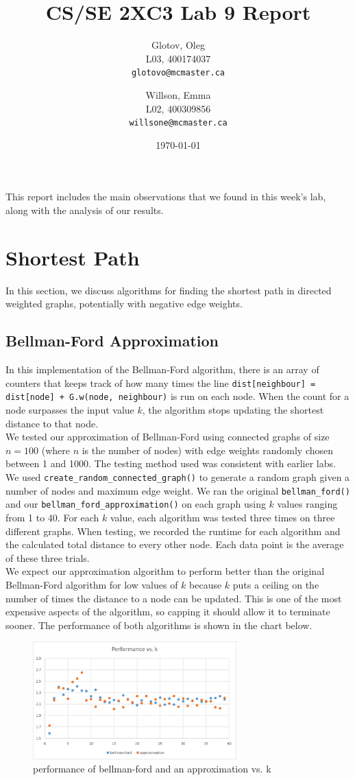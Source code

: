 \documentclass[12pt]{article}
\title{CS/SE 2XC3 Lab 9 Report}
\author{
  Glotov, Oleg\\ L03, 400174037\\
  \texttt{glotovo@mcmaster.ca}
  \and
  Willson, Emma\\ L02, 400309856\\
  \texttt{willsone@mcmaster.ca}
  }
\date{\today}
\begin{document}
\maketitle

This report includes the main observations that we found in this week's lab, along with the analysis of our results.

\newpage 
\section{Shortest Path}
In this section, we discuss algorithms for finding the shortest path in directed weighted graphs, potentially with negative edge weights. 
\subsection{Bellman-Ford Approximation}
In this implementation of the Bellman-Ford algorithm, there is an array of counters that keeps track of how many times the line \verb-dist[neighbour] = dist[node] + G.w(node, neighbour)- is run on each node. When the count for a node surpasses the input value $k$, the algorithm stops updating the shortest distance to that node.\\
We tested our approximation of Bellman-Ford using connected graphs of size $n=100$ (where $n$ is the number of nodes) with edge weights randomly chosen between 1 and 1000.
The testing method used was consistent with earlier labs. We used \verb+create_random_connected_graph()+ to generate a random graph given a number of nodes and maximum edge weight. We ran the original \verb+bellman_ford()+ and our \verb+bellman_ford_approximation()+ on each graph using $k$ values ranging from 1 to 40. For each $k$ value, each algorithm was tested three times on three different graphs. When testing, we recorded the runtime for each algorithm and the calculated total distance to every other node. Each data point is the average of these three trials. \\
We expect our approximation algorithm to perform better than the original Bellman-Ford algorithm for low values of $k$ because $k$ puts a ceiling on the number of times the distance to a node can be updated. This is one of the most expensive aspects of the algorithm, so capping it should allow it to terminate sooner. The performance of both algorithms is shown in the chart below.
\begin{figure}[H]
\centering
\includegraphics[width=0.7\textwidth,height=\textheight,keepaspectratio]{bellman_ford_time.png}
\caption{performance of bellman-ford and an approximation vs. k}
\label{Figure: m1}
\end{figure}
\end{document}
